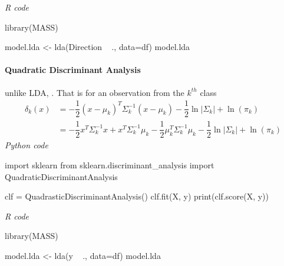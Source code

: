 \emph{R code}
\begin{rcode}[deletekeywords={model, lda, data, df}]
library(MASS)

model.lda <- lda(Direction ~ ., data=df)
model.lda
\end{rcode}

\paragraph{Quadratic Discriminant Analysis}
unlike LDA, .
That is for an observation from the $k^{th}$ class 
\begin{align*}
	\delta_{k}(x) &= -\dfrac{1}{2}(x-\mu_{k})^{T}\Sigma_{k}^{-1}(x-\mu_{k})-\dfrac{1}{2}\ln|\Sigma_{k}|+\ln(\pi_{k})\\
	&= -\dfrac{1}{2}x^{T}\Sigma_{k}^{-1}x+x^{T}\Sigma_{k}^{-1}\mu_{k}-\dfrac{1}{2}\mu_{k}^{T}\Sigma_{k}^{-1}\mu_{k}-\dfrac{1}{2}\ln|\Sigma_{k}|+\ln(\pi_{k})
\end{align*}
\emph{Python code}
\begin{python}
import sklearn
from sklearn.discriminant_analysis import QuadraticDiscriminantAnalysis

clf = QuadrasticDiscriminantAnalysis()
clf.fit(X, y)
print(clf.score(X, y))
\end{python}


\emph{R code}
\begin{rcode}[deletekeywords={model, lda, data, df}]
library(MASS)

model.lda <- lda(y ~ ., data=df)
model.lda
\end{rcode}
